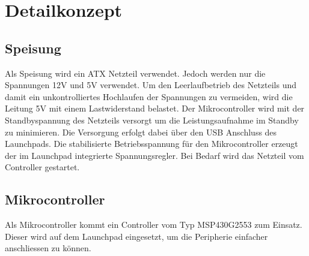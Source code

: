



\section{Detailkonzept}

\subsection{Speisung}
Als Speisung wird ein ATX Netzteil verwendet. Jedoch werden nur die Spannungen 
12V und 5V verwendet. Um den Leerlaufbetrieb des Netzteils und damit ein 
unkontrolliertes Hochlaufen der Spannungen zu vermeiden, wird die Leitung 5V 
mit einem Lastwiderstand belastet. Der Mikrocontroller wird mit der 
Standbyspannung des Netzteils versorgt um die Leistungsaufnahme im Standby zu 
minimieren. Die Versorgung erfolgt dabei über den USB Anschluss des 
Launchpads. Die stabilisierte Betriebsspannung für den Mikrocontroller erzeugt 
der im Launchpad integrierte Spannungsregler. Bei Bedarf wird das Netzteil vom 
Controller gestartet. 

\subsection{Mikrocontroller}
Als Mikrocontroller kommt ein Controller vom Typ MSP430G2553 zum Einsatz. 
Dieser wird auf dem Launchpad eingesetzt, um die Peripherie einfacher 
anschliessen zu können. 


